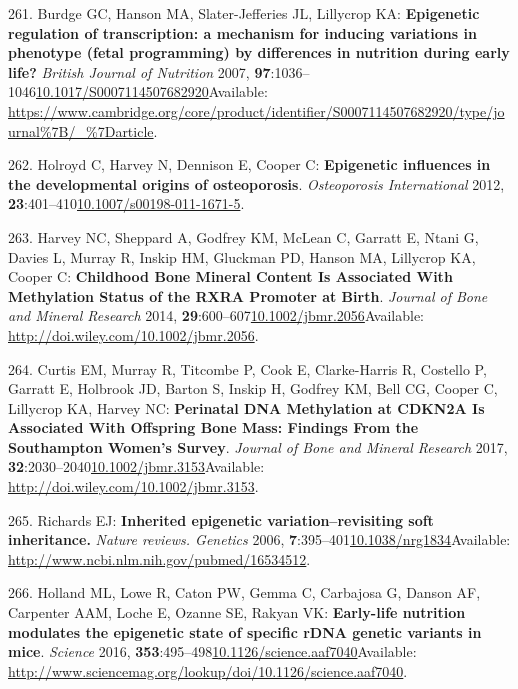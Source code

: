 \documentclass[
]{book}
\begin{document}
\leavevmode\hypertarget{ref-Burdge2007}{}%
261. Burdge GC, Hanson MA, Slater-Jefferies JL, Lillycrop KA: \textbf{Epigenetic regulation of transcription: a mechanism for inducing variations in phenotype (fetal programming) by differences in nutrition during early life?} \emph{British Journal of Nutrition} 2007, \textbf{97}:1036--1046\href{https://doi.org/10.1017/S0007114507682920}{10.1017/S0007114507682920}Available: \url{https://www.cambridge.org/core/product/identifier/S0007114507682920/type/journal\%7B/_\%7Darticle}.

\leavevmode\hypertarget{ref-Holroyd2012}{}%
262. Holroyd C, Harvey N, Dennison E, Cooper C: \textbf{Epigenetic influences in the developmental origins of osteoporosis}. \emph{Osteoporosis International} 2012, \textbf{23}:401--410\href{https://doi.org/10.1007/s00198-011-1671-5}{10.1007/s00198-011-1671-5}.

\leavevmode\hypertarget{ref-Harvey2014d}{}%
263. Harvey NC, Sheppard A, Godfrey KM, McLean C, Garratt E, Ntani G, Davies L, Murray R, Inskip HM, Gluckman PD, Hanson MA, Lillycrop KA, Cooper C: \textbf{Childhood Bone Mineral Content Is Associated With Methylation Status of the RXRA Promoter at Birth}. \emph{Journal of Bone and Mineral Research} 2014, \textbf{29}:600--607\href{https://doi.org/10.1002/jbmr.2056}{10.1002/jbmr.2056}Available: \url{http://doi.wiley.com/10.1002/jbmr.2056}.

\leavevmode\hypertarget{ref-Curtis2017}{}%
264. Curtis EM, Murray R, Titcombe P, Cook E, Clarke-Harris R, Costello P, Garratt E, Holbrook JD, Barton S, Inskip H, Godfrey KM, Bell CG, Cooper C, Lillycrop KA, Harvey NC: \textbf{Perinatal DNA Methylation at CDKN2A Is Associated With Offspring Bone Mass: Findings From the Southampton Women's Survey}. \emph{Journal of Bone and Mineral Research} 2017, \textbf{32}:2030--2040\href{https://doi.org/10.1002/jbmr.3153}{10.1002/jbmr.3153}Available: \url{http://doi.wiley.com/10.1002/jbmr.3153}.

\leavevmode\hypertarget{ref-Richards2006}{}%
265. Richards EJ: \textbf{Inherited epigenetic variation--revisiting soft inheritance.} \emph{Nature reviews. Genetics} 2006, \textbf{7}:395--401\href{https://doi.org/10.1038/nrg1834}{10.1038/nrg1834}Available: \url{http://www.ncbi.nlm.nih.gov/pubmed/16534512}.

\leavevmode\hypertarget{ref-Holland2017}{}%
266. Holland ML, Lowe R, Caton PW, Gemma C, Carbajosa G, Danson AF, Carpenter AAM, Loche E, Ozanne SE, Rakyan VK: \textbf{Early-life nutrition modulates the epigenetic state of specific rDNA genetic variants in mice}. \emph{Science} 2016, \textbf{353}:495--498\href{https://doi.org/10.1126/science.aaf7040}{10.1126/science.aaf7040}Available: \url{http://www.sciencemag.org/lookup/doi/10.1126/science.aaf7040}.
\end{document}
